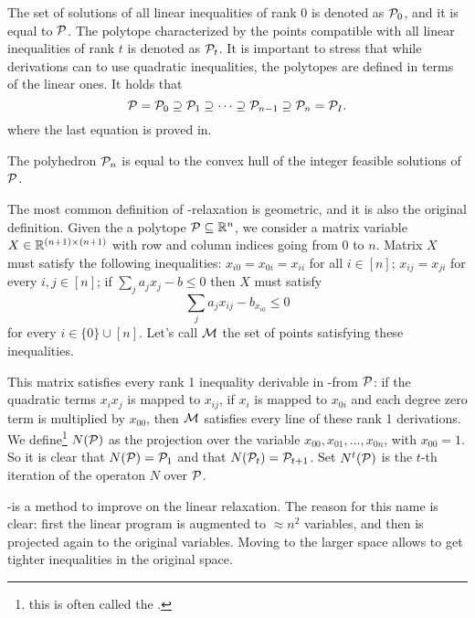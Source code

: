 \documentclass[a4paper,twoside,justified]{tufte-handout}
\begin{document}
The set of solutions of all linear inequalities of rank $ 0 $ is
denoted as $ \mathcal{P}_{0} $, and it is equal to $ \mathcal{P} $. The
polytope characterized by the points compatible with all linear
inequalities of rank $ t $ is denoted as $ \mathcal{P}_{t} $. It is
important to stress that while derivations can to use quadratic
inequalities, the polytopes are defined in terms of the linear
ones. It holds that
%
\begin{equation}
  \mathcal{P}=\mathcal{P}_{0} \supseteq \mathcal{P}_{1} \supseteq \cdots
  \supseteq \mathcal{P}_{n-1} \supseteq \mathcal{P}_{n}=\mathcal{P}_{I}.
\end{equation}
%
where the last equation is proved in\cite{lovasz1991cones}.

\begin{theorem}
  The polyhedron $ \mathcal{P}_{n} $ is equal to the convex hull of the
  integer feasible solutions of $ \mathcal{P} $.
\end{theorem}

The most common definition of \Lovasz-\Schrijver relaxation is
geometric, and it is also the original definition. Given the a
polytope $ \mathcal{P} \subseteq  \mathbb{R}^{n} $, we consider a
matrix variable $X \in \mathbb{R}^{(n+1)\times(n+1)} $ with row and
column indices going from $ 0 $ to $ n $. Matrix $X$ must satisfy the
following inequalities: $ x_{i0} = x_{0i} = x_{ii} $ for all $ i \in
[n] $; $ x_{ij}=x_{ji} $ for every $ i,j \in [n]$; if $
\sum_{j}a_{j}x_{j} - b \leq 0 $ then $ X $ must satisfy
\begin{equation*}
  \sum_{j}a_{j}x_{ij} - b_{x_{i0}} \leq 0
\end{equation*}
for every $ i \in \{0\}\cup[n]$. Let's call $ \mathcal{M} $ the set of
points satisfying these inequalities.

This matrix satisfies every rank 1 inequality derivable in
\Lovasz-\Schrijver from $\mathcal{P}$: if the quadratic terms $ x_{i}x_{j}
$ is mapped to $ x_{ij} $, if $ x_{i} $ is mapped to $ x_{0i} $ and
each degree zero term is multiplied by $ x_{00} $, then $ \mathcal{M} $
satisfies every line of these rank 1 derivations.
%
We
define\footnote{this is often called the
  .}  $ N(\mathcal{P}) $ as the
projection over the variable $ x_{00},x_{01},\ldots, x_{0n} $, with $
x_{00}=1 $. So it is clear that $ N(\mathcal{P})=\mathcal{P}_{1} $ and that $
N(\mathcal{P}_{t})=\mathcal{P}_{t+1} $. Set $ N^{t}(\mathcal{P}) $ is the $ t
$-th iteration of the operaton $ N $ over $ \mathcal{P} $.

\Lovasz-\Schrijver is a  method to
improve on the linear relaxation. The reason for this name is clear:
first the linear program is augmented to $ \approx n^{2} $ variables,
and then is projected again to the original variables. Moving to the
larger space allows to get tighter inequalities in the original space.
\end{document}
